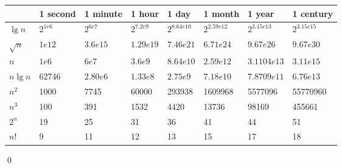 \begingroup
\scriptsize
\begin{tabular}{|l|l|l|l|l|l|l|l|}
    \hline
               & 1 second  & 1 minute    & 1 hour       & 1 day         & 1 month         & 1 year                                                      & 1 century          \\ \hline
    $\lg n$    & $2^{1e6}$ & $2^{6e7}$  & $2^{7.2e9}$ & $2^{8.64e10}$ & $2^{2.59e12}$ & $2^{3.15e13}$ & $2^{3.15e15}$ \\ \hline
    $\sqrt{n}$ & $1e12$    & $3.6e15$    & $1.29e19$   & $7.46e21$   & $6.71e24$   & $9.67e26$                                               & $9.67e30$      \\ \hline
    $n$        & $1e6$     & $6e7$       & $3.6e9$      & $8.64e10$     & $2.59e12$      & $3.1104e13$                                                 & $3.11e15$        \\ \hline
    $n \lg n$  & 62746     & $2.80e6$ & $1.33e8$  & $2.75e9$   & $7.18e10$    & $7.8709e11$                                                 & $6.76e13$       \\ \hline
    $n^2$      & 1000      & 7745        & 60000        & 293938        & 1609968         & 5577096                                                     & 55770960           \\ \hline
    $n^3$      & 100       & 391         & 1532         & 4420          & 13736           & 98169                                                       & 455661             \\ \hline
    $2^n$      & 19        & 25          & 31           & 36            & 41              & 44                                                          & 51                 \\ \hline
    $n!$       & 9         & 11          & 12           & 13            & 15              & 17                                                          & 18                 \\ \hline
\end{tabular}
\endgroup

\qed